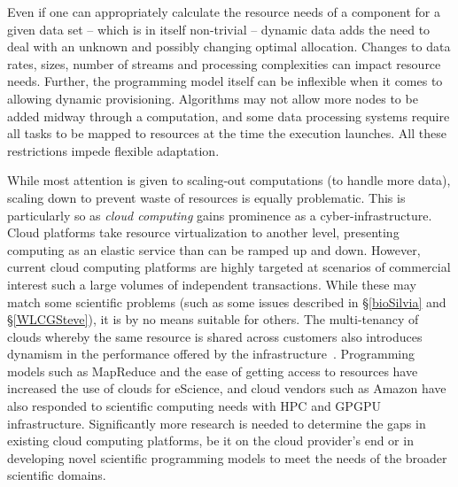 Even if one can appropriately calculate the resource needs of a
component for a given data set -- which is in itself non-trivial --
dynamic data adds the need to deal with an unknown and possibly
changing optimal allocation. Changes to data rates, sizes, number of streams and processing
complexities can impact resource needs. Further, the programming
model itself can be inflexible when it comes to allowing dynamic
provisioning. Algorithms may not allow more nodes to be added midway
through a computation, and some data processing systems require all tasks to
be mapped to resources at the time the execution launches. All these
restrictions impede flexible adaptation.


While most attention is given to
scaling-out computations (to handle more data), scaling down to
prevent waste of resources is equally problematic. This is particularly so as 
\emph{cloud computing} gains prominence as a cyber-infrastructure. Cloud platforms take
resource virtualization to another level, 
presenting computing as an elastic service than can be ramped up and down.
However, current cloud computing platforms are
highly targeted at scenarios of commercial interest such a
large volumes of independent transactions. While these may match some
scientific problems (such as some issues described in
 \S\ref{bioSilvia}  and \S\ref{WLCGSteve}), it is by no means suitable for
others. The multi-tenancy of clouds whereby the same resource is shared across customers also
introduces dynamism in the performance offered by the
infrastructure~\cite{iosup:ccgrid:2011}. 
Programming models such as MapReduce and the ease of getting access to resources have increased the
use of clouds for eScience, and cloud vendors such as Amazon have also responded to scientific
computing needs with HPC and GPGPU infrastructure. 
Significantly more research is needed to determine 
the gaps in existing cloud computing platforms, be it on the cloud provider's end or in developing
novel scientific programming models  to meet the needs of the broader scientific domains.


